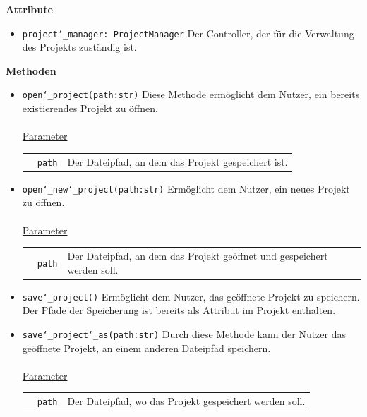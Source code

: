 \documentclass{article}
\begin{document}
\textbf{{Attribute}}
\begin{itemize}
\item \texttt{project\char`_manager: ProjectManager} \newline Der Controller, der für die Verwaltung des Projekts zuständig ist.
\end{itemize}

\textbf{{Methoden}}
\begin{itemize}
\item \texttt{open\char`_project(path:str)} \newline Diese Methode ermöglicht dem Nutzer, ein bereits existierendes Projekt zu öffnen.
\\\\
\underline{{Parameter}}\\
\begin{tabular}{lll}
 & \texttt{path} & Der Dateipfad, an dem das Projekt gespeichert ist. \\
\end{tabular}

\item \texttt{open\char`_new\char`_project(path:str)} \newline Ermöglicht dem Nutzer, ein neues Projekt zu öffnen.
\\\\
\underline{{Parameter}}\\
\begin{tabular}{lll}
 & \texttt{path} & Der Dateipfad, an dem das Projekt geöffnet und gespeichert werden soll. \\
\end{tabular}

\item \texttt{save\char`_project()} \newline Ermöglicht dem Nutzer, das geöffnete Projekt zu speichern. Der Pfade der Speicherung ist bereits als Attribut im Projekt enthalten.


\item \texttt{save\char`_project\char`_as(path:str)} \newline Durch diese Methode kann der Nutzer das geöffnete Projekt, an einem anderen Dateipfad speichern.
\\\\
\underline{{Parameter}}\\
\begin{tabular}{lll}
 & \texttt{path} & Der Dateipfad, wo das Projekt gespeichert werden soll. \\
\end{tabular}



\end{itemize}
\end{document}
